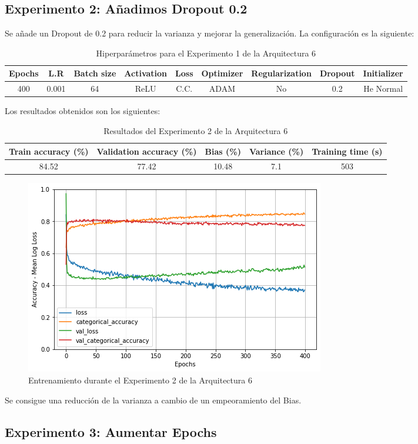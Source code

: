 \documentclass{article}
\begin{document}
        \subsection{Experimento 2: A\~{n}adimos Dropout 0.2}
        \label{b-s-a6-e2}
            Se a\~{n}ade un Dropout de 0.2 para reducir la varianza y mejorar la generalizaci\'on. La configuraci\'on es la siguiente: 
   
            \begin{table}[!h]
				\begin{tabular}{|c|c|c|c|c|c|c|c|c|}
					\textbf{Epochs}&\textbf{L.R}&\textbf{Batch size}&\textbf{Activation}&\textbf{Loss}&\textbf{Optimizer}&\textbf{Regularization}&\textbf{Dropout}  & \textbf{Initializer} \\ \hline
					400 & 0.001 & 64 & ReLU & C.C. & ADAM & No & 0.2 & He Normal
				\end{tabular}
				\caption{Hiperpar\'ametros para el Experimento 1 de la Arquitectura 6}
				\label{tab:hip-b-a6-e2}
			\end{table}
   
            Los resultados obtenidos son los siguientes: 
            \begin{table}[!h]
				\begin{center}
					\begin{tabular}{| c | c | c | c | c |}
						\textbf{Train accuracy (\%)} & \textbf{Validation accuracy (\%)} & \textbf{Bias (\%)} & \textbf{Variance (\%)} & \textbf{Training time (s)} \\ \hline
						 84.52 & 77.42 & 10.48  & 7.1 & 503 \\ \hline
					\end{tabular}
					\caption{Resultados del Experimento 2 de la Arquitectura 6}
					\label{tab:res-b-a6-e2}
				\end{center}
			\end{table}
            \begin{figure}[!h]
				\begin{center}
					\includegraphics[scale=0.5]{b-tr-a6-e2.png}		
					\caption{Entrenamiento durante el Experimento 2 de la Arquitectura 6}	
					\label{b-tr-a6-e2}
				\end{center}
			\end{figure}
            Se consigue una reducci\'on de la varianza a cambio de un empeoramiento del Bias. 
            
        \subsection{Experimento 3: Aumentar Epochs}
        \label{b-s-a6-e3}
\end{document}
